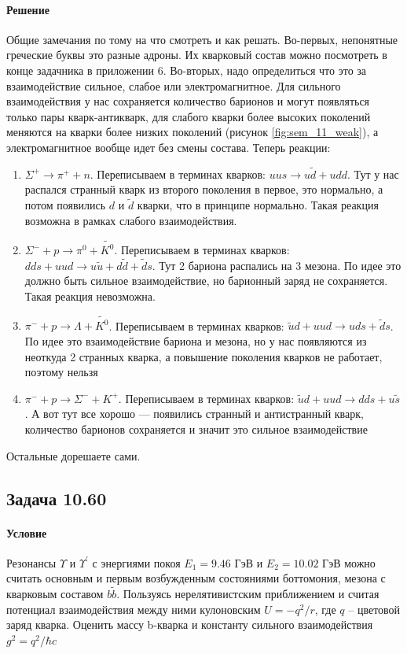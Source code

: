 \documentclass[12pt]{article}
\begin{document}
\paragraph{Решение}
Общие замечания по тому на что смотреть и как решать. Во-первых, непонятные греческие буквы это разные адроны. Их кварковый состав можно посмотреть в конце задачника в приложении 6. Во-вторых, надо определиться что это за взаимодействие сильное, слабое  или электромагнитное. Для сильного взаимодействия у нас сохраняется количество барионов и могут появляться только пары кварк-антикварк, для слабого кварки более высоких поколений меняются на кварки более низких поколений (рисунок \ref{fig:sem_11_weak}), а электромагнитное вообще идет без смены состава. Теперь реакции:
\begin{enumerate}
    \item $\Sigma^+ \rightarrow \pi^+ + n$. Переписываем в терминах кварков: $uus \rightarrow u\widetilde{d} + udd$. Тут у нас распался странный кварк из второго поколения в первое, это нормально, а потом появились $d$ и $\widetilde{d}$ кварки, что в принципе нормально. Такая реакция возможна в рамках слабого взаимодействия.
    \item $\Sigma^- + p\rightarrow \pi^0 + \widetilde{K^0}$. Переписываем в терминах кварков: $dds + uud \rightarrow u\widetilde{u} + d\widetilde{d} + \widetilde{d}s$. Тут 2 бариона распались на 3 мезона. По идее это должно быть сильное взаимодействие, но барионный заряд не сохраняется. Такая реакция невозможна.
    \item $\pi^- + p \rightarrow \Lambda + \widetilde{K^0}$. Переписываем в терминах кварков: $ \widetilde{u}d + uud \rightarrow uds + \widetilde{d}s$. По идее это взаимодействие бариона и мезона, но у нас появляются из неоткуда 2 странных кварка, а повышение поколения кварков не работает, поэтому нельзя
    \item $\pi^- + p \rightarrow \Sigma^- + K^+$. Переписываем в терминах кварков: $ \widetilde{u}d + uud \rightarrow dds + u\widetilde{s}$. А вот тут все хорошо --- появились странный и антистранный кварк, количество барионов сохраняется и значит это сильное взаимодействие
\end{enumerate}
Остальные дорешаете сами.

\subsection{Задача 10.60}
\label{task_}
\paragraph{Условие}
Резонансы $\Upsilon$ и $\Upsilon^'$ с энергиями покоя $E_1 = 9.46$ ГэВ и $E_2 = 10.02$ ГэВ можно считать основным и первым возбужденным состояниями боттомония, мезона с кварковым составом $b\widetilde{b}$. Пользуясь нерелятивистским приближением и считая потенциал взаимодействия между ними кулоновским $U=-q^2/r$, где $q$ -- цветовой заряд кварка. Оценить массу b-кварка и константу сильного взаимодействия $g^2=q^2/\hbar c$
\end{document}
